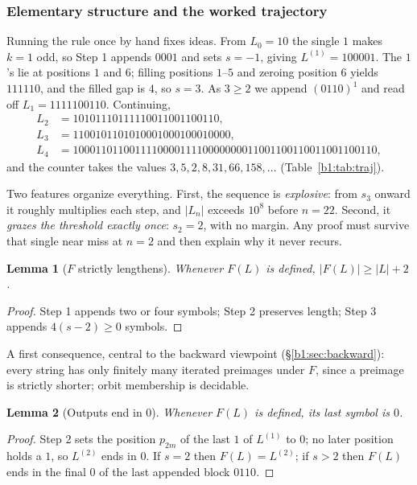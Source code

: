 \documentclass[a4paper]{article}
\theoremstyle{plain}
\newtheorem{lemma}{Lemma}[subsection]
\theoremstyle{definition}
\theoremstyle{remark}
\begin{document}
\subsubsection{Elementary structure and the worked trajectory}\label{b1:sec:elem}
Running the rule once by hand fixes ideas. From $L_0=10$ the single $1$ makes $k=1$ odd, so Step 1 appends $0001$ and sets $s=-1$, giving $L^{(1)}=100001$. The $1$'s lie at positions $1$ and $6$; filling positions $1$--$5$ and zeroing position $6$ yields $111110$, and the filled gap is $4$, so $s=3$. As $3\ge 2$ we append $(0110)^1$ and read off $L_1=1111100110$. Continuing,
\begin{align*}
L_2 &= 10101110111110011001100110,\\
L_3 &= 1100101101010001000100010000,\\
L_4 &= 100011011001111000011110000000011001100110011001100110,
\end{align*}
and the counter takes the values $3,5,2,8,31,66,158,\dots$ (Table~\ref{b1:tab:traj}).

Two features organize everything. First, the sequence is \emph{explosive}: from $s_3$ onward it roughly multiplies each step, and $|L_n|$ exceeds $10^8$ before $n=22$. Second, it \emph{grazes the threshold exactly once}: $s_2=2$, with no margin. Any proof must survive that single near miss at $n=2$ and then explain why it never recurs.

\begin{lemma}[$F$ strictly lengthens]\label{b1:lem:length}
Whenever $F(L)$ is defined, $|F(L)|\ge|L|+2$.
\end{lemma}
\begin{proof}
Step 1 appends two or four symbols; Step 2 preserves length; Step 3 appends $4(s-2)\ge 0$ symbols.
\end{proof}

A first consequence, central to the backward viewpoint (\S\ref{b1:sec:backward}): every string has only finitely many iterated preimages under $F$, since a preimage is strictly shorter; orbit membership is decidable.

\begin{lemma}[Outputs end in $0$]\label{b1:lem:end0}
Whenever $F(L)$ is defined, its last symbol is $0$.
\end{lemma}
\begin{proof}
Step 2 sets the position $p_{2m}$ of the last $1$ of $L^{(1)}$ to $0$; no later position holds a $1$, so $L^{(2)}$ ends in $0$. If $s=2$ then $F(L)=L^{(2)}$; if $s>2$ then $F(L)$ ends in the final $0$ of the last appended block $0110$.
\end{proof}
\end{document}
